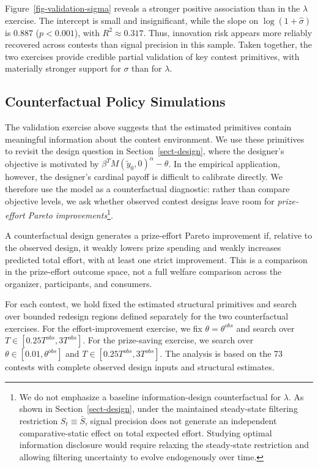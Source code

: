\documentclass[mnsc]{informs3}
\begin{document}
Figure~\ref{fig-validation-sigma} reveals a stronger positive association than in the $\lambda$ exercise.
The intercept is small and insignificant, while the slope on $\log(1+\hat{\sigma})$ is 0.887 ($p<0.001$), with $R^2\approx0.317$.
Thus, innovation risk appears more reliably recovered across contests than signal precision in this sample.
Taken together, the two exercises provide credible partial validation of key contest primitives, with materially stronger support for $\sigma$ than for $\lambda$.


\subsection{Counterfactual Policy Simulations}

The validation exercise above suggests that the estimated primitives contain
meaningful information about the contest environment. We use these primitives to
revisit the design question in Section~\ref{sect-design}, where the designer's
objective is motivated by $\beta^{T}M(\tilde{y}_0,0)^\alpha-\theta$. In the
empirical application, however, the designer's cardinal payoff is difficult to
calibrate directly. We therefore use the model as a counterfactual diagnostic:
rather than compare objective levels, we ask whether observed contest designs
leave room for \textit{prize-effort Pareto improvements}\footnote{
We do not emphasize a baseline information-design counterfactual for
$\lambda$. As shown in Section~\ref{sect-design}, under the maintained
steady-state filtering restriction $S_t\equiv\bar S$, signal precision does not
generate an independent comparative-static effect on total expected effort.
Studying optimal information disclosure would require relaxing the steady-state
restriction and allowing filtering uncertainty to evolve endogenously over time.
}.

A counterfactual design generates a prize-effort Pareto improvement if, relative
to the observed design, it weakly lowers prize spending and weakly increases
predicted total effort, with at least one strict improvement. This is a
comparison in the prize-effort outcome space, not a full welfare comparison
across the organizer, participants, and consumers.

For each contest, we hold fixed the estimated structural primitives and search
over bounded redesign regions defined separately for the two counterfactual exercises.
For the effort-improvement exercise, we fix
$\theta=\theta^{obs}$ and search over $T\in[0.25T^{obs},3T^{obs}]$.
For the prize-saving exercise, we search over
$\theta\in[0.01,\theta^{obs}]$ and $T\in[0.25T^{obs},3T^{obs}]$.
The analysis is based on the 73 contests with complete observed design inputs
and structural estimates.
\end{document}
